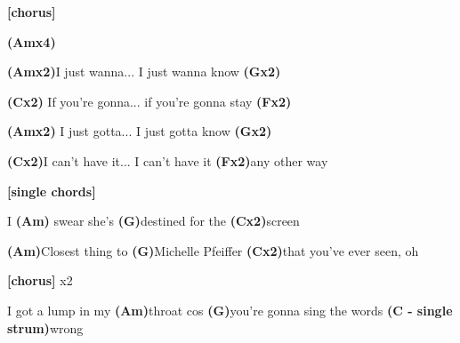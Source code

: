 \documentclass{article}
\newenvironment{song}{%
	\pagebreak%
	\parindent0pt%
    \Large%
}{%
}%
\newcommand{\ch}[1]{\textbf{(#1)}}
\newcommand{\rep}[1]{\hspace{2pt}x#1}
\newcommand{\note}[1]{\textbf{[#1]}}
\begin{document}
\begin{song}
\bigskip

\note{chorus} \par

\bigskip

\ch{Am\rep4} \par
\ch{Am\rep2}I just wanna... I just wanna know \ch{G\rep2} \par
\ch{C\rep2} If you're gonna... if you're gonna stay \ch{F\rep2} \par
\ch{Am\rep2} I just gotta... I just gotta know \ch{G\rep2} \par
\ch{C\rep2}I can't have it... I can't have it \ch{F\rep2}any other way \par
\note{single chords} \par
I \ch{Am} swear she's \ch{G}destined for the \ch{C\rep2}screen \par
\ch{Am}Closest thing to \ch{G}Michelle Pfeiffer \ch{C\rep2}that you've ever seen, oh \par

\bigskip


\note{chorus} x2 \par

\bigskip

I got a lump in my \ch{Am}throat cos \ch{G}you're gonna sing the words \ch{C - single strum}wrong \par

\end{song}
\end{document}
